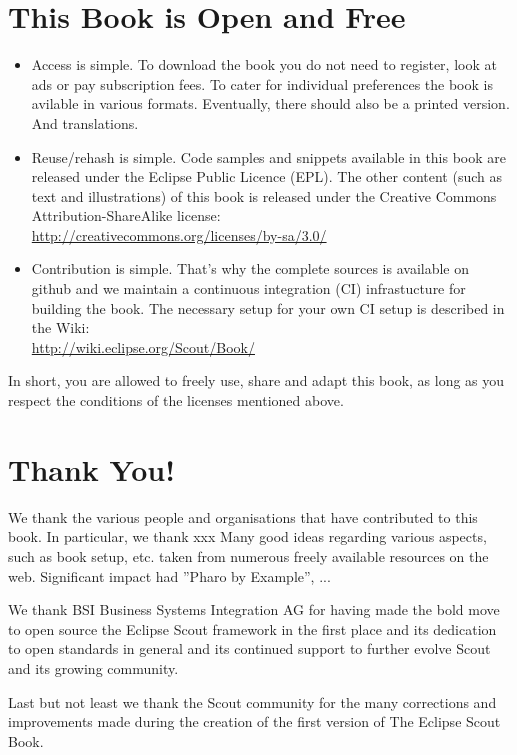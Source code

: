 \documentclass[a4paper,10pt,twoside]{book}
\begin{document}
\newpage

\section*{This Book is Open and Free}

\begin{itemize}
\item Access is simple. To download the book you do not need to register, 
look at ads or pay subscription fees. To cater for individual
preferences the book is avilable in various formats. 
Eventually, there should also be a printed version. And translations.

\item Reuse/rehash is simple. Code samples and snippets available in this book are 
released  under the Eclipse Public Licence (EPL). The other content (such as text and 
illustrations) of this book is released under the Creative Commons Attribution-ShareAlike 
license:\\
\url{http://creativecommons.org/licenses/by-sa/3.0/}

\item Contribution is simple. That's why the complete sources is available on github
and we maintain a continuous integration (CI) infrastucture for building the book. 
The necessary setup for your own CI setup is described in the Wiki: \\
\url{http://wiki.eclipse.org/Scout/Book/}
\end{itemize}

In short, you are allowed to freely use, share and adapt this book, as long as you 
respect the conditions of the licenses mentioned above.


\section*{Thank You!}

We thank the various people and organisations that have contributed 
to this book. In particular, we thank xxx
Many good ideas regarding various aspects, such as book setup, etc. taken from 
numerous freely available resources on the web. 
Significant impact had ''Pharo by Example'', ...

We thank BSI Business Systems Integration AG for having made the bold move 
to open source the Eclipse Scout framework in the first place and its 
dedication to open standards in general and its continued support to further
evolve Scout and its growing community.

Last but not least we thank the Scout community for the many corrections and improvements 
made during the creation of the first version of The Eclipse Scout Book.


\ifx\wholebook\relax\else
   
   
\end{document}
